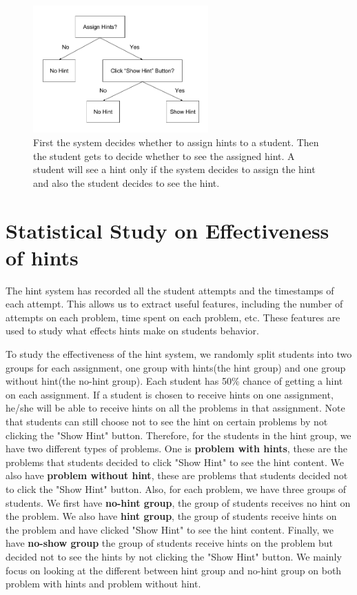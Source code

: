 \documentclass{llncs}
\begin{document}
\begin{figure}[ht]
   \centering
   \includegraphics[width=0.6\textwidth]{image/Show_Hint.png}
   \caption{First the system decides whether to assign hints to a student. Then the student gets to decide whether to see the assigned hint. A student will see a hint only if the system decides to assign the hint and also the student decides to see the hint.}
   \label{fig:show_hint}
\end{figure}


\section{Statistical Study on Effectiveness of hints}
The hint system has recorded all the student attempts and the timestamps of each attempt. This allows us to extract useful features, including the number of attempts on each problem, time spent on each problem, etc. These features are used to study what effects hints make on students behavior.

To study the effectiveness of the hint system, we randomly split students into two groups for each assignment, one group with hints(the hint group) and one group without hint(the no-hint group). Each student has 50\% chance of getting a hint on each assignment. If a student is chosen to receive hints on one assignment, he/she will be able to receive hints on all the problems in that assignment. Note that students can still choose not to see the hint on certain problems by not clicking the "Show Hint" button. Therefore, for the students in the hint group, we have two different types of problems. One is \textbf{problem with hints}, these are the problems that students decided to click "Show Hint" to see the hint content. We also have \textbf{problem without hint}, these are problems that students decided not to click the "Show Hint" button. Also, for each problem, we have three groups of students. We first have \textbf{no-hint group}, the group of students receives no hint on the problem. We also have \textbf{hint group}, the group of students receive hints on the problem and have clicked "Show Hint" to see the hint content. Finally, we have \textbf{no-show group} the group of students receive hints on the problem but decided not to see the hints by not clicking the "Show Hint" button. We mainly focus on looking at the different between hint group and no-hint group on both problem with hints and problem without hint.
\end{document}
